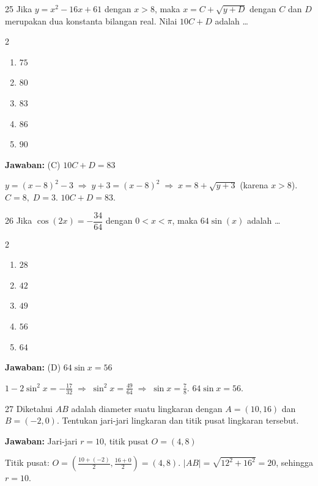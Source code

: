 \documentclass[11pt]{article}
\newcommand{\jawaban}[1]{%
  \noindent\colorbox{gold!30}{\parbox{\dimexpr\linewidth-2\fboxsep\relax}{%
    \textbf{Jawaban:} #1}}\par\smallskip}
\newenvironment{pilB}{%
  \par\smallskip\begin{multicols}{2}
  \begin{enumerate}[label=(\Alph*),leftmargin=*,itemsep=1pt,topsep=3pt]}%
  {\end{enumerate}\end{multicols}}
\begin{document}
\begin{soal}{25}
Jika $y=x^2-16x+61$ dengan $x>8$, maka $x=C+\sqrt{y+D}$ dengan
$C$ dan $D$ merupakan dua konstanta bilangan real. Nilai $10C+D$
adalah \ldots
\begin{pilB}
  \item $75$ \item $80$ \item $83$ \item $86$ \item $90$
\end{pilB}
\end{soal}
\begin{pembox}
\jawaban{(C) $10C+D=83$}
$y=(x-8)^2-3\;\Rightarrow\;y+3=(x-8)^2\;\Rightarrow\;x=8+\sqrt{y+3}$ (karena $x>8$).
$C=8,\;D=3$. $10C+D=83$.
\end{pembox}

\begin{soal}{26}
Jika $\cos(2x)=-\dfrac{34}{64}$ dengan $0<x<\pi$,
maka $64\sin(x)$ adalah \ldots
\begin{pilB}
  \item $28$ \item $42$ \item $49$ \item $56$ \item $64$
\end{pilB}
\end{soal}
\begin{pembox}
\jawaban{(D) $64\sin x=56$}
$1-2\sin^2 x=-\tfrac{17}{32}\;\Rightarrow\;\sin^2 x=\tfrac{49}{64}\;\Rightarrow\;\sin x=\tfrac{7}{8}$.
$64\sin x=56$.
\end{pembox}

\begin{soal}{27}
Diketahui $AB$ adalah diameter suatu lingkaran dengan $A=(10,16)$
dan $B=(-2,0)$. Tentukan jari-jari lingkaran dan titik pusat
lingkaran tersebut.
\end{soal}
\begin{pembox}
\jawaban{Jari-jari $r=10$, titik pusat $O=(4,8)$}
Titik pusat: $O=\left(\tfrac{10+(-2)}{2},\tfrac{16+0}{2}\right)=(4,8)$.
$|AB|=\sqrt{12^2+16^2}=20$, sehingga $r=10$.
\end{pembox}
\end{document}

